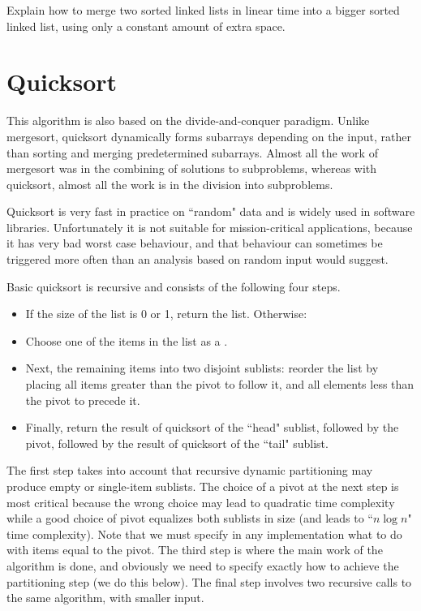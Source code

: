 \begin{Exercise} \label{exr:linked-list-merge}
Explain how to merge two sorted linked lists in linear time into a bigger 
sorted linked list, using only a constant amount of extra space. 
\end{Exercise}


\section{Quicksort}\label{sec:qsort}

This algorithm is also based on the divide-and-conquer paradigm. Unlike 
mergesort, quicksort dynamically forms subarrays depending on the input,
rather than sorting and merging predetermined subarrays. Almost all the work of 
mergesort was in the combining of solutions to subproblems, whereas with 
quicksort, almost all the work is in the division into subproblems. 

Quicksort is very fast in practice on ``random" data and is widely used in 
software libraries. Unfortunately it is not suitable for mission-critical 
applications, because it has very bad worst case behaviour, and that behaviour 
can sometimes be triggered more often than an analysis based on random input 
would suggest.

Basic quicksort is recursive and consists of the following four steps. 

\begin{itemize}
\item  If the size of the list is 0 or 1, return the list. Otherwise:
\item Choose one of the items in the list as a . 
\item Next,  the remaining items into two disjoint sublists: 
reorder the list by placing all items greater than the pivot to follow it,
 and all elements less than the pivot to precede it.
\item Finally, return the result of quicksort of the ``head" sublist,
followed by the pivot, followed by the result of quicksort
of the ``tail" sublist.
\end{itemize}

The first step takes into account that recursive dynamic partitioning may produce 
empty or single-item sublists. The choice of a pivot at the next step is most 
critical because the wrong choice may lead to quadratic time complexity while a 
good choice of pivot equalizes both sublists in size (and leads to ``$n\log n$" 
time complexity). Note that we must specify
in any implementation what to do with items equal to the pivot. The third step is 
where the main work of the algorithm is done, and obviously we need to specify 
exactly how to achieve the partitioning step (we do this below). The final step
involves two recursive calls to the same algorithm, with smaller input.

